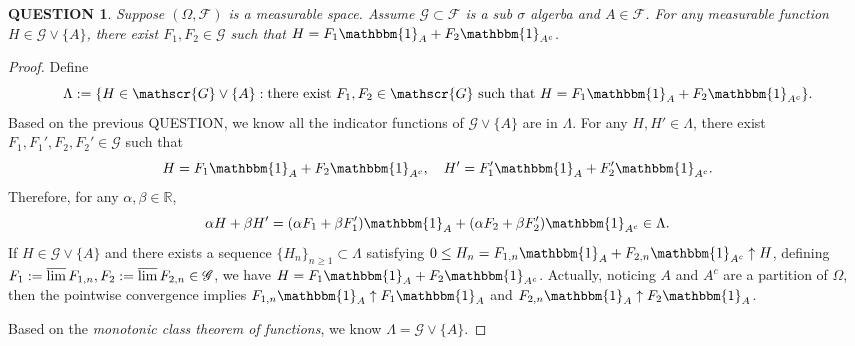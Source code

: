 \documentclass[12pt]{article}
\renewcommand{\(}{\left(}%
\renewcommand{\)}{\right)}%
\renewcommand{\[}{\left[}%
\renewcommand{\]}{\right]}%
\renewcommand{\r}{\mathbb{R}}
\newcommand{\f}{\mathscr{F}}
\newcommand{\g}{\mathscr{G}}
\newtheorem{question}{QUESTION}[section]}
\newtheorem{proof}{Proof.}}
\begin{document}
  \begin{question}
  	Suppose $(\Omega,\f)$ is a measurable space. Assume $\g\subset \f$ is a sub $\sigma$ algerba and $A\in\f$. For any measurable function $H\in \g\vee\{A\}$, there exist $F_1,F_2\in \g$ such that $H=F_1\mathbbm{1}_A+F_2\mathbbm{1}_{A^c}$.
  \end{question}
  \begin{proof}
  	Define 
  	\begin{equation*}
  		\Lambda:=\{H\in \g\vee\{A\}:\text{there exist $F_1,F_2\in \g$ such that $H=F_1\mathbbm{1}_A+F_2\mathbbm{1}_{A^c}$}\}.
  	\end{equation*}
  	Based on the previous QUESTION, we know all the indicator functions of $\g\vee\{A\}$ are in $\Lambda$. For any $H,H'\in\Lambda$, there exist $F_1,F_1',F_2,F_2'\in\g$ such that
  	\begin{equation*}
  		H=F_1\mathbbm{1}_A+F_2\mathbbm{1}_{A^c},\quad H'=F_1'\mathbbm{1}_A+F_2'\mathbbm{1}_{A^c}.
  	\end{equation*}
  	Therefore, for any $\alpha,\beta\in\r$,
  	\begin{equation*}
  		\alpha H+\beta H'=(\alpha F_1+\beta F_1')\mathbbm{1}_A+(\alpha F_2+\beta F_2')\mathbbm{1}_{A^c}\in\Lambda.
  	\end{equation*}
  	If $H\in\g\vee\{A\}$ and there exists a sequence $\{H_n\}_{n\geq 1}\subset\Lambda$ satisfying $0\leq H_n=F_{1,n}\mathbbm{1}_A+F_{2,n}\mathbbm{1}_{A^c}\uparrow H$, defining $F_1:=\varlimsup F_{1,n},F_2:=\varlimsup F_{2,n}\in \g$, we have $H=F_{1}\mathbbm{1}_A+F_{2}\mathbbm{1}_{A^c}$. Actually, noticing $A$ and $A^c$ are a partition of $\Omega$, then the pointwise convergence implies $F_{1,n}\mathbbm{1}_A\uparrow F_1\mathbbm{1}_A$ and $F_{2,n}\mathbbm{1}_A\uparrow F_2\mathbbm{1}_A$. 
  	
  	Based on the {\itshape monotonic class theorem of functions}, we know $\Lambda=\g\vee\{A\}$.
  \end{proof}
  
\end{document}
